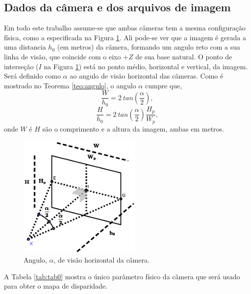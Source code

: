 \documentclass[a4paper,10pt]{article}
\begin{document}
\subsection{Dados da câmera e dos arquivos de imagem}
Em todo este trabalho  assume-se que ambas câmeras tem a mesma configuração física,
como a especificada na Figura \ref{fig:camera}. Ali pode-se ver que a imagem é
gerada a uma distancia $h_0$ (em metros) da câmera, formando um angulo reto com a sua linha
de visão, que coincide com o eixo $+Z$ de sua base natural. O ponto de interseção
($I$ na Figura \ref{fig:camera}) está no ponto médio, horizontal e vertical, da imagem.
Será definido como $\alpha$ ao angulo de visão horizontal das câmeras. Como é 
mostrado no Teorema \ref{teo:angulo}, o angulo $\alpha$ cumpre que,
\begin{equation} \label{eq:dat1}
 \frac{W}{h_0}=2~tan(\frac{\alpha}{2}),
\end{equation}
\begin{equation} \label{eq:dat2}
 \frac{H}{h_0}=2~tan(\frac{\alpha}{2})\frac{H_p}{W_p} ,
\end{equation}
onde $W$ é $H$ são o comprimento e a altura da imagem, ambas em metros.
\begin{figure}[!]
\center
 \includegraphics[width=6.0cm]{./images/camera.eps}
\caption{Angulo, $\alpha$, de visão horizontal da câmera.}
\label{fig:camera}
\end{figure} 
A Tabela \ref{tab:tab0} mostra o único parâmetro físico da câmera que será usado
para obter o mapa de disparidade.
\end{document}
